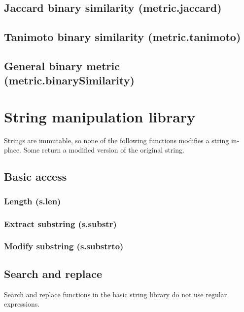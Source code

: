 \documentclass{article}
\theoremstyle{definition}
\begin{document}
\subsection{Jaccard binary similarity (metric.jaccard)}

\subsection{Tanimoto binary similarity (metric.tanimoto)}

\subsection{General binary metric (metric.binarySimilarity)}

\pagebreak

\section{String manipulation library}

Strings are immutable, so none of the following functions modifies a string in-place.  Some return a modified version of the original string.

\subsection{Basic access}

\subsubsection{Length (s.len)}

\subsubsection{Extract substring (s.substr)}

\subsubsection{Modify substring (s.substrto)}

\subsection{Search and replace}

Search and replace functions in the basic string library do not use regular expressions.
\end{document}
